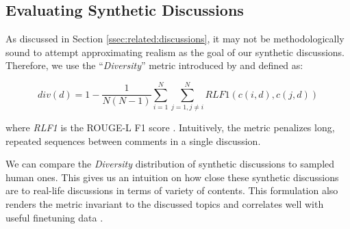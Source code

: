 




\subsection{Evaluating Synthetic Discussions}
\label{ssec:methodology:diversity}

As discussed in Section \ref{ssec:related:discussions}, it may not be methodologically sound to attempt approximating realism as the goal of our synthetic discussions. Therefore, we use the “\textit{Diversity}” metric introduced by \citet{ulmer2024} and defined as:

\small
\begin{equation}
\label{eq:variety}
    div(d) = 1- \frac{1}{N(N-1)} \sum_{i=1}^N \sum_{j=1, j \neq i}^N \textit{RLF1}(c(i, d), c(j, d))
\end{equation}
\normalsize

\noindent where \textit{RLF1} is the ROUGE-L F1 score \cite{lin-2004-rouge}. Intuitively, the metric  penalizes long, repeated sequences between comments in a single discussion. 

We can compare the \textit{Diversity} distribution of synthetic discussions to sampled human ones. This gives us an intuition on how close these synthetic discussions are to real-life discussions in terms of variety of contents. This formulation also renders the metric invariant to the discussed topics and correlates well with useful finetuning data \cite{ulmer2024}.